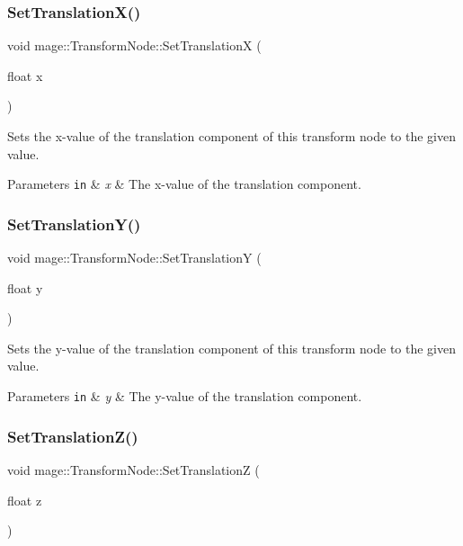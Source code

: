\subsubsection{\texorpdfstring{Set\+Translation\+X()}{SetTranslationX()}}
{\footnotesize\ttfamily void mage\+::\+Transform\+Node\+::\+Set\+TranslationX (\begin{DoxyParamCaption}\item[{float}]{x }\end{DoxyParamCaption})}

Sets the x-\/value of the translation component of this transform node to the given value.


\begin{DoxyParams}[1]{Parameters}
\mbox{\tt in}  & {\em x} & The x-\/value of the translation component. \\
\hline
\end{DoxyParams}
\hypertarget{classmage_1_1_transform_node_a299fab4e618c7221569ebe65a7f8320e}{}\label{classmage_1_1_transform_node_a299fab4e618c7221569ebe65a7f8320e} 
\subsubsection{\texorpdfstring{Set\+Translation\+Y()}{SetTranslationY()}}
{\footnotesize\ttfamily void mage\+::\+Transform\+Node\+::\+Set\+TranslationY (\begin{DoxyParamCaption}\item[{float}]{y }\end{DoxyParamCaption})}

Sets the y-\/value of the translation component of this transform node to the given value.


\begin{DoxyParams}[1]{Parameters}
\mbox{\tt in}  & {\em y} & The y-\/value of the translation component. \\
\hline
\end{DoxyParams}
\hypertarget{classmage_1_1_transform_node_aa774136e2965eb5474d7cc326c3e987a}{}\label{classmage_1_1_transform_node_aa774136e2965eb5474d7cc326c3e987a} 
\subsubsection{\texorpdfstring{Set\+Translation\+Z()}{SetTranslationZ()}}
{\footnotesize\ttfamily void mage\+::\+Transform\+Node\+::\+Set\+TranslationZ (\begin{DoxyParamCaption}\item[{float}]{z }\end{DoxyParamCaption})}

